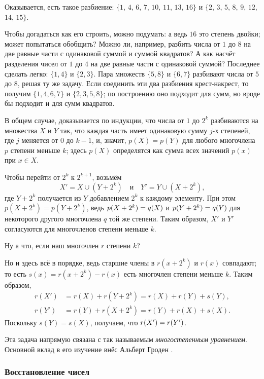 Оказывается, есть такое разбиение: $\{1$, $4$, $6$, $7$, $10$, $11$, $13$, $16\}$ и $\{2$, $3$, $5$, $8$, $9$, $12$, $14$, $15\}$.

Чтобы догадаться как его строить, можно подумать:
а ведь $16$ это степень двойки;
может попытаться обобщить?
Можно ли, например, разбить числа от $1$ до $8$ на две равные части с одинаковой суммой и суммой квадратов?
А как насчёт разделения чисел от $1$ до $4$ на две равные части с одинаковой суммой?
Последнее сделать легко: $\{1, 4\}$ и $\{2, 3\}$.
Пара множеств $\{5, 8\}$ и $\{6, 7\}$ разбивают числа от $5$ до $8$, решая ту же задачу.
Если соединить эти два разбиения крест-накрест, то получим $\{1, 4, 6, 7\}$ и $\{2, 3, 5, 8\}$; по построению оно подходит для сумм, но вроде бы подходит и для сумм квадратов.

В общем случае, доказывается по индукции, что числа от $1$ до $2^k$ разбиваются на множества $X$ и $Y$ так, что каждая часть имеет одинаковую сумму $j$-х степеней, где $j$ меняется от $0$ до $k - 1$, и, значит, $p(X)=p(Y)$ для любого многочлена $p$ степени меньше $k$;
здесь $p(X)$ определятся как сумма всех значений $p(x)$ при $x \in X$.

Чтобы перейти от $2^{k}$ к $2^{k+1}$, возьмём 
\[X' = X \cup (Y + 2^k)\quad\text{и}\quad Y' = Y \cup (X + 2^k),\]
где $Y + 2^k$ получается из $Y$ добавлением $2^k$ к каждому элементу.
При этом $p(X + 2^k) = p(Y + 2^k)$,
ведь $p(X + 2^k)\z=q(X)$ и $p(Y + 2^k)\z=q(Y)$ для некоторого другого многочлена $q$ той же степени.
Таким образом, $X'$ и $Y'$ согласуются для многочленов степени меньше $k$. 

Ну а что, если наш многочлен $r$ степени $k$?

Но и здесь всё в порядке, ведь старшие члены в $r(x+2^k)$ и $r(x)$ совпадают;
то есть $s(x)=r(x+2^k)-r(x)$ есть многочлен степени меньше $k$.
Таким образом,
\begin{align*}
r(X')&=r(X)+r(Y+2^k)=r(X)+r(Y)+s(Y),
\\
r(Y')&=r(Y)+r(X+2^k)=r(Y)+r(X)+s(X).
\end{align*}
Поскольку $s(Y)=s(X)$, получаем, что $r(X')\z=r(Y')$.

Эта задача напрямую связана с так называемым \emph{многостепенным уравнением}.
Основной вклад в его изучение внёс Альберт Гроден \cite{gloden}.

\subsubsection*{Восстановление чисел}

